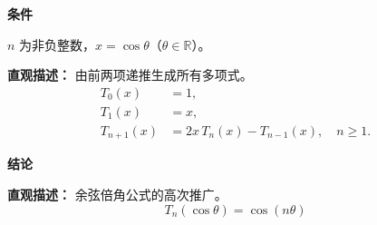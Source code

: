 \begin{statementbox}

	\textbf{\textcolor{CStatement}{条件}}
	\begin{description}[style=nextline, leftmargin=2.8em, labelsep=0.5em, itemsep=0.35em]
		\item[\textbf{\textcolor{CStatement}{条件1（参数定义）：}}] $n$ 为非负整数，$x = \cos\theta$（$\theta\in\mathbb{R}$）。
		\item[\textbf{\textcolor{CStatement}{条件2（递推定义）：}}]
			\textbf{\textcolor{CStatement}{直观描述：}}
			由前两项递推生成所有多项式。
			\[
				\begin{aligned}
					T_0(x) &= 1, \\
					T_1(x) &= x, \\
					T_{n+1}(x) &= 2x\,T_n(x) - T_{n-1}(x), \quad n\ge 1.
			\end{aligned}
			\]
	\end{description}

	\textbf{\textcolor{CStatement}{结论}}
	\begin{description}[style=nextline, leftmargin=2.8em, labelsep=0.5em, itemsep=0.45em]
		\item[\textbf{\textcolor{CStatement}{结论（三角恒等式）：}}]
			\textbf{\textcolor{CStatement}{直观描述：}}
			余弦倍角公式的高次推广。
			\[
				T_n(\cos\theta) = \cos(n\theta)
			\]
	\end{description}

\end{statementbox}

